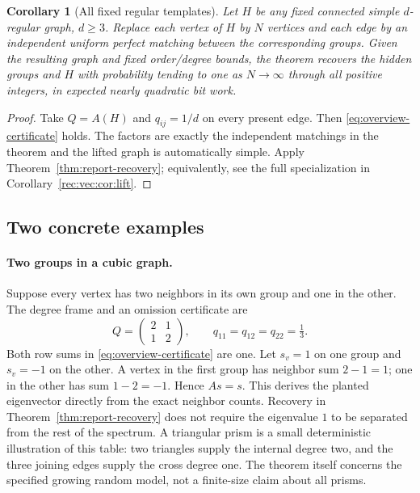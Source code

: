 \documentclass[11pt]{article}
\newtheorem{corollary}[theorem]{Corollary}
\theoremstyle{definition}
\theoremstyle{remark}
\newcommand{\1}{\mathbf 1}
\begin{document}
\begin{corollary}[All fixed regular templates]\label{cor:report-lifts}
Let $H$ be any fixed connected simple $d$-regular graph, $d\ge3$.
Replace each vertex of $H$ by $N$ vertices and each edge by an independent
uniform perfect matching between the corresponding groups. Given the
resulting graph and fixed order/degree bounds, the theorem recovers the
hidden groups and $H$ with probability tending to one as $N\to\infty$
through all positive integers, in expected nearly quadratic bit work.
\end{corollary}
\begin{proof}
Take $Q=A(H)$ and $q_{ij}=1/d$ on every present edge. Then
\eqref{eq:overview-certificate} holds. The factors are exactly the
independent matchings in the theorem and the lifted graph is automatically
simple. Apply Theorem~\ref{thm:report-recovery}; equivalently, see the full
specialization in Corollary~\ref{rec:vec:cor:lift}.
\end{proof}

\subsection{Two concrete examples}
\paragraph{Two groups in a cubic graph.}
Suppose every vertex has two neighbors in its own group and one in the
other. The degree frame and an omission certificate are
\[
 Q=\begin{pmatrix}2&1\\1&2\end{pmatrix},\qquad
 q_{11}=q_{12}=q_{22}=\tfrac13.
\]
Both row sums in \eqref{eq:overview-certificate} are one. Let $s_v=1$ on
one group and $s_v=-1$ on the other. A vertex in the first group has
neighbor sum $2-1=1$; one in the other has sum $1-2=-1$. Hence
$As=s$. This derives the planted eigenvector directly from the exact
neighbor counts. Recovery in Theorem~\ref{thm:report-recovery} does not
require the eigenvalue $1$ to be separated from the rest of the spectrum.
A triangular prism is a small deterministic illustration of this table:
two triangles supply the internal degree two, and the three joining
edges supply the cross degree one. The theorem itself concerns the
specified growing random model, not a finite-size claim about all prisms.
\end{document}
